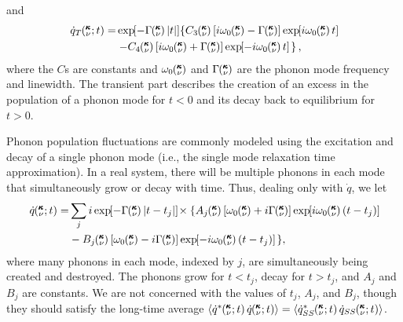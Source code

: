 and
\begin{equation}\label{E:qdot_A_T}
\begin{split}
\dot{q}_{T}\kvt=& \EXP{-\Gamma\kv |t|}\left\{C_3\kv
\left[i\omega_0\kv-\Gamma\kv\right]\EXP{i\omega_0\kv t}\right. \\
& \left.-C_4\kv\left[i\omega_0\kv+\Gamma\kv\right]\EXP{-i\omega_0\kv t}\;
\right\},
\end{split}
\end{equation}
where the $C$s are constants and $\omega_0\mspace{-4.0mu}\left(\mspace{-8.0mu} \begin{smallmatrix}&\pmb{\kappa} \\&\nu\end{smallmatrix} \mspace{-3.0mu}\right)$ and $\Gamma\mspace{-4.0mu}\left(\mspace{-8.0mu} \begin{smallmatrix}&\pmb{\kappa} \\&\nu\end{smallmatrix} \mspace{-3.0mu}\right)$ are the 
phonon
mode frequency and linewidth.  The transient part
describes the creation of an excess in the population of a phonon mode 
for
$t<0$ and its decay back to equilibrium for $t>0$.

Phonon population fluctuations are commonly modeled using the excitation 
and decay of
a single phonon mode (i.e., the single mode relaxation time approximation).
\cite{ziman_electrons_2001} 
In a real system, there will be multiple phonons in
each mode that simultaneously grow or decay with time.  Thus, dealing 
only
with $\dot{q}$, we let
\begin{equation}\label{A:E:qdot_A_kvbat}
\begin{split}
\dot{q}\kvt =& \sum_j i\EXP{-\Gamma\kv |t-t_j|}\times 
\lbrace A_j\kv\left[\omega_0\kv+i\Gamma\kv\right]
\EXP{i\omega_0\kv (t-t_j)} \\
& -B_j\kv \left[\omega_0\kv-i\Gamma\kv\right]\EXP{-i\omega_0\kv (t-t_j) }
\; \rbrace,
\end{split}
\end{equation}
where many phonons in each mode, indexed by $j$, are simultaneously 
being
created and destroyed.  The phonons grow for $t<t_j$, decay for $t>t_j$,
and $A_j$ and $B_j$ are constants.  We are  not concerned with the 
values of
$t_j$, $A_j$, and $B_j$, though they should satisfy the long-time average
$\langle\dot{q}^*\kvt\dot{q}\kvt\rangle = \langle\dot{q}_{SS}^*\kvt
\dot{q}_{SS}\kvt\rangle$.

